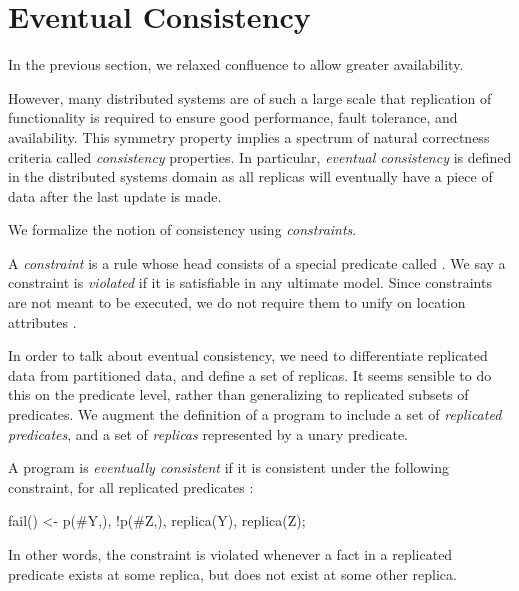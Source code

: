 \section{Eventual Consistency}

In the previous section, we relaxed confluence to allow greater availability.

However, many distributed systems are of such a large scale that replication of functionality is required to ensure good performance, fault tolerance, and availability.  This symmetry property implies a spectrum of natural correctness criteria called {\em consistency} properties.  In particular, {\em eventual consistency} is defined in the distributed systems domain as all replicas will eventually have a piece of data after the last update is made.


We formalize the notion of consistency using {\em constraints}.

\begin{definition}
A {\em constraint} is a rule whose head consists of a special predicate called .  We say a constraint is {\em violated} if it is satisfiable in any ultimate model.  Since constraints are not meant to be executed, we do not require them to unify on location attributes .
\end{definition}

In order to talk about eventual consistency, we need to differentiate replicated data from partitioned data, and define a set of replicas.  It seems sensible to do this on the predicate level, rather than generalizing to replicated subsets of predicates.  We augment the definition of a \lang program to include a set of {\em replicated predicates}, and a set of {\em replicas} represented by a unary  predicate.

\begin{definition}
\label{def:ec}
A \lang program is {\em eventually consistent} if it is consistent under the following constraint, for all replicated predicates :

\begin{Dedalus}
fail() <- p(#Y,), !p(#Z,), replica(Y), replica(Z);
\end{Dedalus}

In other words, the constraint is violated whenever a fact in a replicated predicate exists at some replica, but does not exist at some other replica.
\end{definition}

